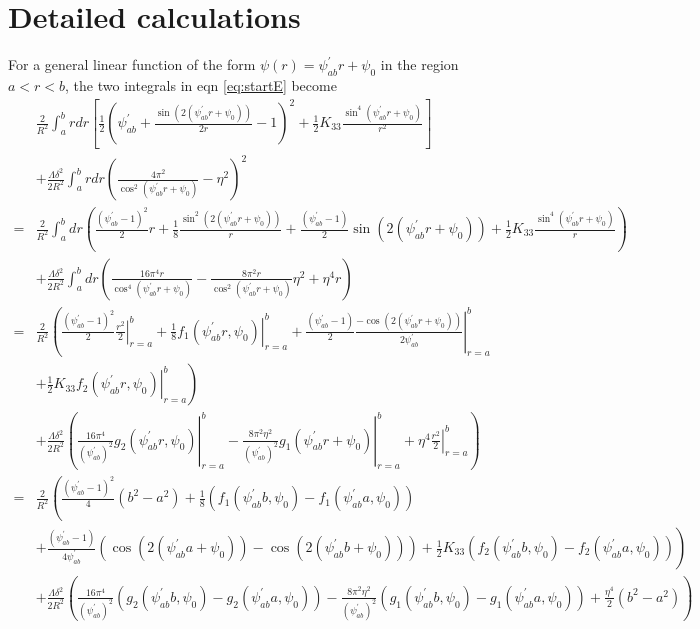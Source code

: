 \documentclass[12pt]{article}
\begin{document}
\section{Detailed calculations}
For a general linear function of the form $\psi(r)=\psi_{ab}^{\prime}r+\psi_0$ in the region $a<r<b$, the two integrals in eqn \ref{eq:startE} become
\begin{align}
\phantom{=}&\frac{2}{R^2}\int_{a}^{b}rdr\left[\frac{1}{2}\left(\psi_{ab}^{\prime}+\frac{\sin(2(\psi_{ab}^{\prime}r+\psi_0))}{2r}-1\right)^2+\frac{1}{2}K_{33}\frac{\sin^4(\psi_{ab}^{\prime}r+\psi_0)}{r^2}\right]\nonumber\\
&+\frac{\Lambda\delta^2}{2R^2}\int_{a}^{b}rdr\left(\frac{4\pi^2}{\cos^2(\psi_{ab}^{\prime}r+\psi_0)}-\eta^2\right)^2\nonumber\\
=&\frac{2}{R^2}\int_{a}^{b}dr\left(\frac{(\psi_{ab}^{\prime}-1)^2}{2}r+\frac{1}{8}\frac{\sin^2(2(\psi_{ab}^{\prime}r+\psi_0))}{r}+\frac{(\psi_{ab}^{\prime}-1)}{2}\sin(2(\psi_{ab}^{\prime}r+\psi_0))+\frac{1}{2}K_{33}\frac{\sin^4(\psi_{ab}^{\prime}r+\psi_0)}{r}\right)\nonumber\\
\phantom{=}&+\frac{\Lambda\delta^2}{2R^2}\int_{a}^{b}dr\left(\frac{16\pi^4r}{\cos^4(\psi_{ab}^{\prime}r+\psi_0)}-\frac{8\pi^2r}{\cos^2(\psi_{ab}^{\prime}r+\psi_0)}\eta^2+\eta^4r\right)\nonumber\\
=&\frac{2}{R^2}\left(\frac{(\psi_{ab}^{\prime}-1)^2}{2}\left.\frac{r^2}{2}\right|_{r=a}^{b}+\left.\frac{1}{8}f_1(\psi_{ab}^{\prime}r,\psi_0)\right|_{r=a}^{b}+\frac{(\psi_{ab}^{\prime}-1)}{2}\left.\frac{-\cos(2(\psi_{ab}^{\prime}r+\psi_0))}{2\psi_{ab}^{\prime}}\right|_{r=a}^{b}\right.\nonumber\\
\phantom{=}&\left.+\left.\frac{1}{2}K_{33}f_2(\psi_{ab}^{\prime}r,\psi_0)\right|_{r=a}^{b}\right)\nonumber\\
\phantom{=}&+\frac{\Lambda\delta^2}{2R^2}\left(\left.\frac{16\pi^4}{(\psi_{ab}^{\prime})^2}g_2(\psi_{ab}^{\prime}r,\psi_0)\right|_{r=a}^{b}-\left.\frac{8\pi^2\eta^2}{(\psi_{ab}^{\prime})^2}g_1(\psi_{ab}^{\prime}r+\psi_0)\right|_{r=a}^{b}+\eta^4\left.\frac{r^2}{2}\right|_{r=a}^{b}\right)\nonumber\\
=&\frac{2}{R^2}\left(\frac{(\psi_{ab}^{\prime}-1)^2}{4}(b^2-a^2)+\frac{1}{8}(f_1(\psi_{ab}^{\prime}b,\psi_0)-f_1(\psi_{ab}^{\prime}a,\psi_0))\right.\nonumber\\
\phantom{=}&\left.+\frac{(\psi_{ab}^{\prime}-1)}{4\psi_{ab}^{\prime}}(\cos(2(\psi_{ab}^{\prime}a+\psi_0))-\cos(2(\psi_{ab}^{\prime}b+\psi_0)))+\frac{1}{2}K_{33}(f_2(\psi_{ab}^{\prime}b,\psi_0)-f_2(\psi_{ab}^{\prime}a,\psi_0))\right)\nonumber\\
\phantom{=}&+\frac{\Lambda\delta^2}{2R^2}\left(\frac{16\pi^4}{(\psi_{ab}^{\prime})^2}(g_2(\psi_{ab}^{\prime}b,\psi_0)-g_2(\psi_{ab}^{\prime}a,\psi_0))-\frac{8\pi^2\eta^2}{(\psi_{ab}^{\prime})^2}(g_1(\psi_{ab}^{\prime}b,\psi_0)-g_1(\psi_{ab}^{\prime}a,\psi_0))+\frac{\eta^4}{2}(b^2-a^2)\right)
\end{align}
\end{document}
